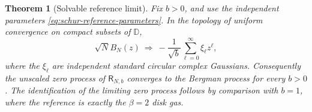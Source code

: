 \documentclass[11pt,a4paper]{article}
\numberwithin{equation}{section}
\newtheorem{theorem}{Theorem}[section]
\theoremstyle{definition}
\theoremstyle{remark}
\begin{document}
\begin{theorem}[Solvable reference limit]
\label{thm:schur-reference-bergman}
Fix $b>0$, and use the independent parameters
\eqref{eq:schur-reference-parameters}. In the topology of uniform
convergence on compact subsets of $\mathbb D$,
\begin{equation}
 \sqrt N B_N(z)\ \Longrightarrow\
 -\frac1{\sqrt b}\sum_{\ell=0}^\infty\xi_\ell z^\ell,
 \label{eq:schur-reference-gaf}
\end{equation}
where the $\xi_\ell$ are independent standard circular complex
Gaussians. Consequently the unscaled zero process of
$\mathsf R_{N,b}$ converges to the Bergman process for every $b>0$.
The identification of the limiting zero process follows by comparison
with $b=1$, where the reference is exactly the $\beta=2$ disk gas.
\end{theorem}
\end{document}
